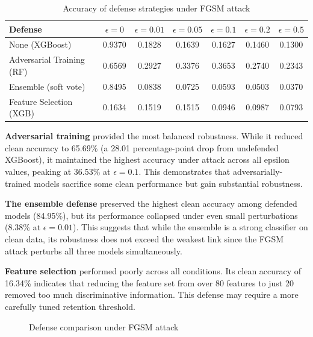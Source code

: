 \documentclass[12pt,a4paper,oneside]{report}
\begin{document}
\begin{table}[H]
    \centering
    \caption[Defense comparison under FGSM]{Accuracy of defense strategies under FGSM attack}\label{tab:defense_fgsm}
    \begin{tabular}{lcccccc}
        \toprule
        Defense & $\epsilon=0$ & $\epsilon=0.01$ & $\epsilon=0.05$ & $\epsilon=0.1$ & $\epsilon=0.2$ & $\epsilon=0.5$ \\
        \midrule
        None (XGBoost)            & 0.9370 & 0.1828 & 0.1639 & 0.1627 & 0.1460 & 0.1300 \\
        Adversarial Training (RF) & 0.6569 & 0.2927 & 0.3376 & 0.3653 & 0.2740 & 0.2343 \\
        Ensemble (soft vote)      & 0.8495 & 0.0838 & 0.0725 & 0.0593 & 0.0503 & 0.0370 \\
        Feature Selection (XGB)   & 0.1634 & 0.1519 & 0.1515 & 0.0946 & 0.0987 & 0.0793 \\
        \bottomrule
    \end{tabular}
\end{table}

\textbf{Adversarial training} provided the most balanced robustness. While it reduced clean accuracy to 65.69\% (a 28.01 percentage-point drop from undefended XGBoost), it maintained the highest accuracy under attack across all epsilon values, peaking at 36.53\% at $\epsilon = 0.1$. This demonstrates that adversarially-trained models sacrifice some clean performance but gain substantial robustness.

\textbf{The ensemble defense} preserved the highest clean accuracy among defended models (84.95\%), but its performance collapsed under even small perturbations (8.38\% at $\epsilon = 0.01$). This suggests that while the ensemble is a strong classifier on clean data, its robustness does not exceed the weakest link since the FGSM attack perturbs all three models simultaneously.

\textbf{Feature selection} performed poorly across all conditions. Its clean accuracy of 16.34\% indicates that reducing the feature set from over 80 features to just 20 removed too much discriminative information. This defense may require a more carefully tuned retention threshold.

\begin{figure}[H]
    \centering
    \caption{Defense comparison under FGSM attack}\label{fig:defense_comp}
\end{figure}
\end{document}
